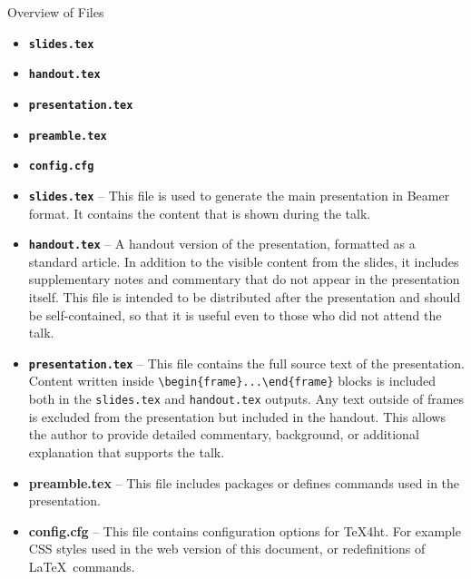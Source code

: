 \begin{frame}[fragile]{Overview of Files}
  \begin{itemize}
   \item \textbf{\texttt{slides.tex}} 
   \item \textbf{\texttt{handout.tex}}
   \item \textbf{\texttt{presentation.tex}}
   \item \textbf{\texttt{preamble.tex}}
   \item \textbf{\texttt{config.cfg}}
  \end{itemize}
\end{frame}
\begin{itemize}
  \item \textbf{\texttt{slides.tex}} – This file is used to generate the main
    presentation in Beamer format. It contains the content that is shown during
    the talk.
  
  \item \textbf{\texttt{handout.tex}} – A handout version of the presentation,
    formatted as a standard article. In addition to the visible content from
    the slides, it includes supplementary notes and commentary that do not
    appear in the presentation itself. This file is intended to be distributed
    after the presentation and should be self-contained, so that it is useful
    even to those who did not attend the talk.
  
  \item \textbf{\texttt{presentation.tex}} – This file contains the full source
    text of the presentation. Content written inside
    \verb|\begin|\verb|{frame}...\end{frame}| blocks is included both in the
    \texttt{slides.tex} and \texttt{handout.tex} outputs. Any text outside of
    frames is excluded from the presentation but included in the handout. This
    allows the author to provide detailed commentary, background, or additional
    explanation that supports the talk.

  \item \textbf{preamble.tex} – This file includes packages or defines commands
    used in the presentation.

  \item \textbf{config.cfg} – This file contains configuration options for
    \TeX4ht. For example CSS styles used in the web version of this document,
    or redefinitions of \LaTeX\ commands.

\end{itemize}

